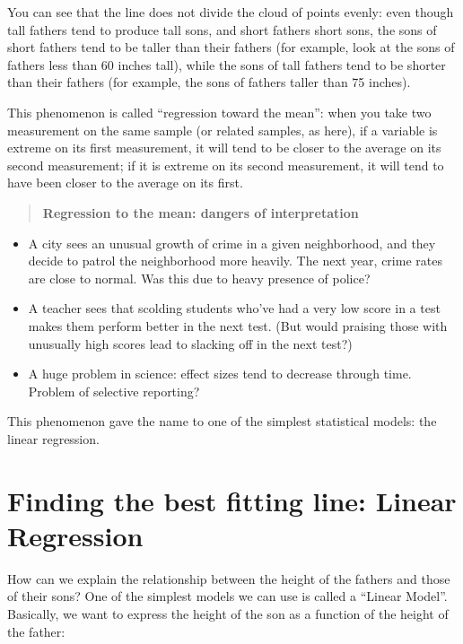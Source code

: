 \documentclass[
  letterpaper,
  DIV=11,
  numbers=noendperiod]{scrreprt}
\providecommand{\tightlist}{%
  \setlength{\itemsep}{0pt}\setlength{\parskip}{0pt}}\usepackage{longtable,booktabs,array}
\begin{document}
You can see that the line does not divide the cloud of points evenly:
even though tall fathers tend to produce tall sons, and short fathers
short sons, the sons of short fathers tend to be taller than their
fathers (for example, look at the sons of fathers less than 60 inches
tall), while the sons of tall fathers tend to be shorter than their
fathers (for example, the sons of fathers taller than 75 inches).

This phenomenon is called ``regression toward the mean'': when you take
two measurement on the same sample (or related samples, as here), if a
variable is extreme on its first measurement, it will tend to be closer
to the average on its second measurement; if it is extreme on its second
measurement, it will tend to have been closer to the average on its
first.

\begin{quote}
\textbf{Regression to the mean: dangers of interpretation}
\end{quote}

\begin{itemize}
\tightlist
\item
  A city sees an unusual growth of crime in a given neighborhood, and
  they decide to patrol the neighborhood more heavily. The next year,
  crime rates are close to normal. Was this due to heavy presence of
  police?
\item
  A teacher sees that scolding students who've had a very low score in a
  test makes them perform better in the next test. (But would praising
  those with unusually high scores lead to slacking off in the next
  test?)
\item
  A huge problem in science: effect sizes tend to decrease through time.
  Problem of selective reporting?
\end{itemize}

This phenomenon gave the name to one of the simplest statistical models:
the linear regression.

\hypertarget{finding-the-best-fitting-line-linear-regression}{%
\section{Finding the best fitting line: Linear
Regression}\label{finding-the-best-fitting-line-linear-regression}}

How can we explain the relationship between the height of the fathers
and those of their sons? One of the simplest models we can use is called
a ``Linear Model''. Basically, we want to express the height of the son
as a function of the height of the father:
\end{document}
